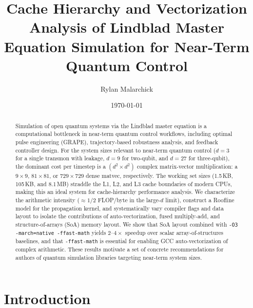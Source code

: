 \documentclass[a4paper,noarxiv]{quantumarticle}
\begin{document}
\title{Cache Hierarchy and Vectorization Analysis of Lindblad Master Equation
       Simulation for Near-Term Quantum Control}

\author{Rylan Malarchick}

\date{\today}

\begin{abstract}
Simulation of open quantum systems via the Lindblad master equation is a
computational bottleneck in near-term quantum control workflows, including
optimal pulse engineering (GRAPE), trajectory-based robustness analysis, and
feedback controller design.
%
For the system sizes relevant to near-term quantum control ($d = 3$
for a single transmon with leakage, $d = 9$ for two-qubit, and $d = 27$
for three-qubit), the dominant cost per timestep is a $(d^2 \times d^2)$
complex matrix-vector multiplication: a $9\times9$, $81\times81$, or
$729\times729$ dense matvec, respectively.
%
The working set sizes (1.5\,KB, 105\,KB, and 8.1\,MB) straddle the
L1, L2, and L3 cache boundaries of modern CPUs, making this an ideal system
for cache-hierarchy performance analysis.
%
We characterize the arithmetic intensity ($\approx 1/2$ FLOP/byte in the
large-$d$ limit), construct a Roofline model for the propagation kernel,
and systematically vary compiler flags and data layout to isolate the
contributions of auto-vectorization, fused multiply-add, and
structure-of-arrays (SoA) memory layout.
%
We show that SoA layout combined with \texttt{-O3 -march=native -ffast-math}
yields $2$--$4\times$ speedup over scalar array-of-structures baselines, and
that \texttt{-ffast-math} is essential for enabling GCC auto-vectorization
of complex arithmetic.
%
These results motivate a set of concrete recommendations for authors of
quantum simulation libraries targeting near-term system sizes.
\end{abstract}

\maketitle

\section{Introduction}
\label{sec:intro}
\end{document}
